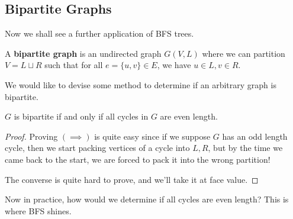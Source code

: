 \subsection{Bipartite Graphs}

  Now we shall see a further application of BFS trees. 

  \begin{definition}
    A \textbf{bipartite graph} is an undirected graph $G(V, L)$ where we can partition $V = L \sqcup R$ such that for all $e = \{u, v\} \in E$, we have $u \in L, v \in R$.  
  \end{definition}

  We would like to devise some method to determine if an arbitrary graph is bipartite. 

  \begin{theorem}
    $G$ is bipartite if and only if all cycles in $G$ are even length. 
  \end{theorem}
  \begin{proof}
    Proving $(\implies)$ is quite easy since if we suppose $G$ has an odd length cycle, then we start packing vertices of a cycle into $L, R$, but by the time we came back to the start, we are forced to pack it into the wrong partition! 

    The converse is quite hard to prove, and we'll take it at face value. 
  \end{proof}

  Now in practice, how would we determine if all cycles are even length? This is where BFS shines. 

